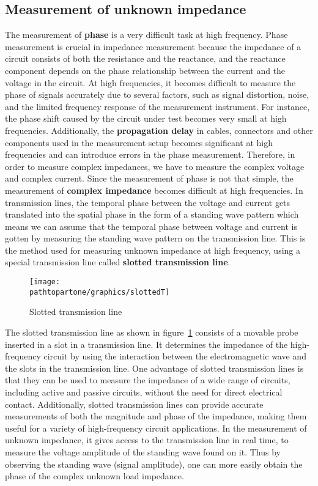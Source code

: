 \subsection{Measurement of unknown impedance }
The measurement of \textbf{phase} is a very difficult task at high frequency. Phase measurement is crucial in impedance measurement because the impedance of a circuit consists of both the resistance and the reactance, and the reactance component depends on the phase relationship between the current and the voltage in the circuit. At high frequencies, it becomes difficult to measure the phase of signals accurately due to several factors, such as signal distortion, noise, and the limited frequency response of the measurement instrument. For instance, the phase shift caused by the circuit under test becomes very small at high frequencies. Additionally, the \textbf{propagation delay} in cables, connectors and other components used in the measurement setup becomes significant at high frequencies and can introduce errors in the phase measurement. Therefore, in order to measure complex impedances, we have to measure the complex voltage and complex current. Since the measurement of phase is not that simple, the measurement of \textbf{complex impedance} becomes difficult at high frequencies. In transmission lines, the temporal phase between the voltage and current gets translated into the spatial phase in the form of a standing wave pattern which means we can assume that the temporal phase between voltage and current is gotten by measuring the standing wave pattern on the transmission line. This is the method used for measuring unknown impedance at high frequency, using a special transmission line called \textbf{slotted
transmission line}.
\begin{figure}[h]
\centering
\texttt{[image: \\pathtopartone/graphics/slottedT]}
\caption{Slotted transmission line}
\label{fig:slottedT}
\end{figure}

The slotted transmission line as shown in figure~\ref{fig:slottedT} consists of a movable probe inserted in a slot in a transmission line. It determines the impedance of the high-frequency circuit by using the interaction between the electromagnetic wave and the slots in the transmission line. One advantage of slotted transmission lines is that they can be used to measure the impedance of a wide range of circuits, including active and passive circuits, without the need for direct electrical contact. Additionally, slotted transmission lines can provide accurate measurements of both the magnitude and phase of the impedance, making them useful for a variety of high-frequency circuit applications. In the measurement of unknown impedance, it gives access to the transmission line in real time, to measure the voltage amplitude of the standing wave found on it. Thus by observing the standing wave (signal amplitude), one can more easily obtain the phase of the complex unknown load impedance.


